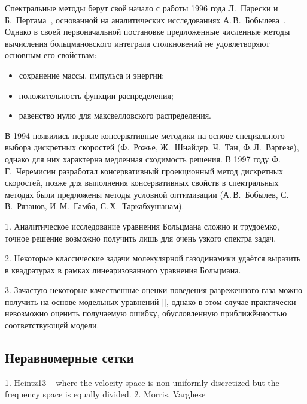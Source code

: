 Спектральные методы берут своё начало с работы 1996 года Л.~Парески и Б.~Пертама~\cite{Pareschi1996},
основанной на аналитических исследованиях А.\,В.~Бобылева~\cite{Bobylev1984}.
Однако в своей первоначальной постановке предложенные численные методы вычисления
больцмановского интеграла столкновений не удовлетворяют основным его свойствам:
\begin{itemize}
    \item сохранение массы, импульса и энергии;
    \item положительность функции распределения;
    \item равенство нулю для максвелловского распределения.
\end{itemize}
В 1994 появились первые консервативные методики на основе специального выбора
дискретных скоростей (Ф.~Рожье, Ж.~Шнайдер, Ч.~Тан, Ф.\,Л.~Варгезе),
однако для них характерна медленная сходимость решения.
В 1997 году Ф.\,Г.~Черемисин разработал консервативный проекционный метод дискретных скоростей,
позже для выполнения консервативных свойств в спектральных методах были предложены методы
условной оптимизации (А.\,В.~Бобылев, С.\,В.~Рязанов, И.\,М.~Гамба, С.\,Х.~Таркабхушанам).



1. Аналитическое исследование уравнения Больцмана сложно и трудоёмко,
точное решение возможно получить лишь для очень узкого спектра задач.

2. Некоторые классические задачи молекулярной газодинамики удаётся выразить в квадратурах
в рамках линеаризованного уравнения Больцмана.

3. Зачастую некоторые качественные оценки поведения разреженного газа можно получить на основе модельных уравнений [],
однако в этом случае практически невозможно оценить получаемую ошибку, обусловленную приближённостью соответствующей модели.


\subsection{Неравномерные сетки}
1. Heintz13 -- where the velocity space is non-uniformly discretized but the frequency space is equally divided.
2. Morris, Varghese

